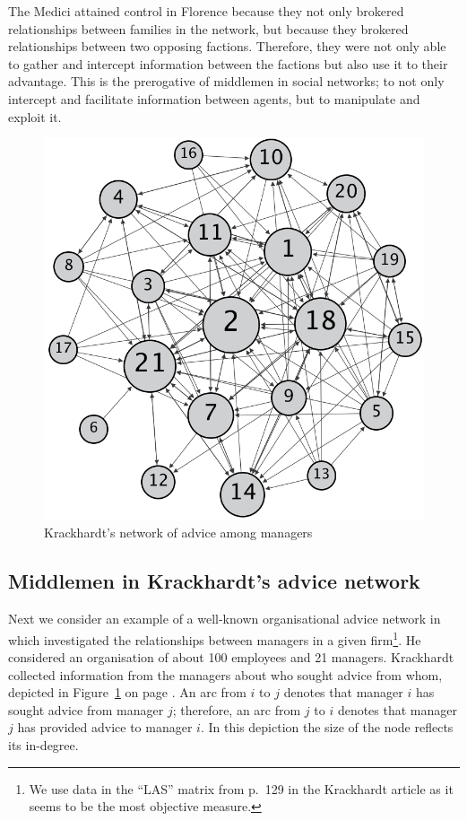 \medskip\noindent The Medici attained control in Florence because they not only brokered relationships between families in the network, but because they brokered relationships between two opposing factions. Therefore, they were not only able to gather and intercept information between the factions but also use it to their advantage. This is the prerogative of middlemen in social networks; to not only intercept and facilitate information between agents, but to manipulate and exploit it.

\begin{figure}[t]
\centering
\includegraphics[scale=0.45]{Images/krack.png}
\caption{Krackhardt's network of advice among managers}
\label{krackhardtnetwork}
\end{figure}

\subsection{Middlemen in Krackhardt's advice network}

Next we consider an example of a well-known organisational advice network in which \citet{Krackhardt1987} investigated the relationships between managers in a given firm\footnote{We use data in the ``LAS'' matrix from p.~129 in the Krackhardt article as it seems to be the most objective measure.}. He considered an organisation of about 100 employees and 21 managers. Krackhardt collected information from the managers about who sought advice from whom, depicted in Figure~\ref{krackhardtnetwork} on page \pageref{krackhardtnetwork}. An arc from $i$ to $j$ denotes that manager $i$ has sought advice from manager $j$; therefore, an arc from $j$ to $i$ denotes that manager $j$ has provided advice to manager $i$. In this depiction the size of the node reflects its in-degree.

